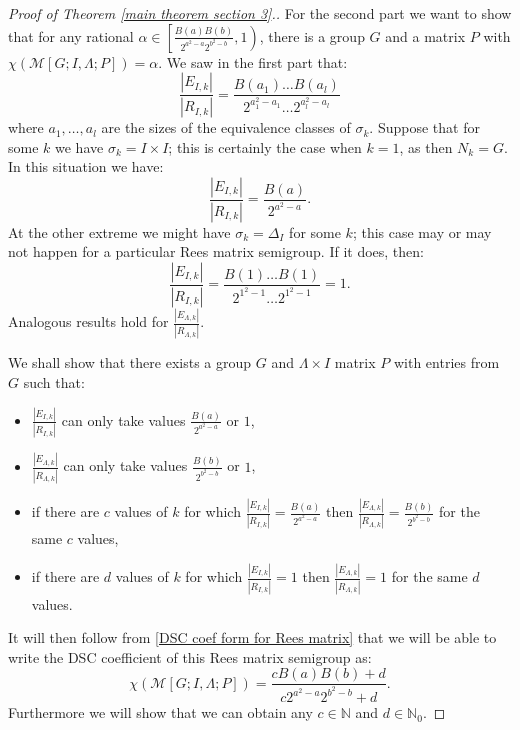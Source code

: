 \documentclass[a4paper, 12pt,reqno]{amsart}
\theoremstyle{plain}
\theoremstyle{definition}
\theoremstyle{remark}
\newcommand{\N}{\mathbb{N}}
\newcommand{\RM}{\mathcal{M}[G;I,\Lambda;P]}
\begin{document}
\begin{proof}[Proof of Theorem \ref{main theorem section 3}.]
    For the second part we want to show that for any rational $\alpha \in \left[\frac{B(a)B(b)}{2^{a^2 - a}2^{b^2 - b}},1\right)$, there is a group $G$ and a matrix $P$ with $\chi(\RM) = \alpha$. 
    We saw in the first part that:
    \begin{equation*}
        \frac{|E_{I,k}|}{|R_{I,k}|} = \frac{B(a_1)\dots B(a_l)}{2^{a_1^2 - a_1}\dots2^{a_l^2 - a_l}} 
    \end{equation*}
    where $a_1 , \dots , a_l$ are the sizes of the equivalence classes of $\sigma_k$.
    Suppose that for some $k$ we have $\sigma_k = I \times I$; this is certainly the case when $k = 1$, as then $N_k = G$.
    In this situation we have:
    \begin{equation*}
        \frac{|E_{I,k}|}{|R_{I,k}|} = \frac{B(a)}{2^{a^2 - a}}.
    \end{equation*}
    At the other extreme we might have $\sigma_k = \Delta_I$ for some $k$; this case may or may not happen for a particular Rees matrix semigroup.
    If it does, then:
    \begin{equation*}
        \frac{|E_{I,k}|}{|R_{I,k}|}= \frac{B(1) \dots B(1)}{2^{1^2 - 1} \dots 2^{1^2 - 1}} = 1.
    \end{equation*}
    Analogous results hold for $\frac{|E_{\Lambda,k}|}{|R_{\Lambda,k}|}$.
    
    We shall show that there exists a group $G$ and $\Lambda \times I$ matrix $P$ with entries from $G$ such that:
    \begin{itemize}
        \item $ \frac{|E_{I,k}|}{|R_{I,k}|}$ can only take values $\frac{B(a)}{2^{a^2 -a}}$ or $1$,
        \item $\frac{|E_{\Lambda,k}|}{|R_{\Lambda,k}|}$ can only take values $\frac{B(b)}{2^{b^2 -b}}$ or $1$,
        \item if there are $c$ values of $k$ for which $\frac{|E_{I,k}|}{|R_{I,k}|} = \frac{B(a)}{2^{a^2 -a}}$ then $\frac{|E_{\Lambda,k}|}{|R_{\Lambda,k}|} = \frac{B(b)}{2^{b^2 - b}}$ for the same $c$ values,
        \item if there are $d$ values of $k$ for which $\frac{|E_{I,k}|}{|R_{I,k}|} = 1$ then $\frac{|E_{\Lambda,k}|}{|R_{\Lambda,k}|} = 1$ for the same $d$ values.
    \end{itemize}
    It will then follow from \eqref{DSC coef form for Rees matrix} that we will be able to write the DSC coefficient of this Rees matrix semigroup as:
    \begin{equation*}
        \chi (\RM) = \frac{cB(a)B(b) + d}{c 2^{a^2 -a}2^{b^2 - b}+d}.
    \end{equation*}
    Furthermore we will show that we can obtain any $c \in \N$ and $d \in \N_0$.


\end{proof}
\end{document}
